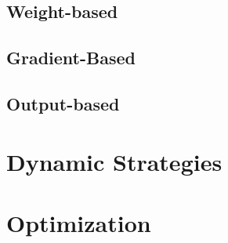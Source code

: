 \subsection{Weight-based}

\subsection{Gradient-Based}

\subsection{Output-based}

\section{Dynamic Strategies}



\section{Optimization}


